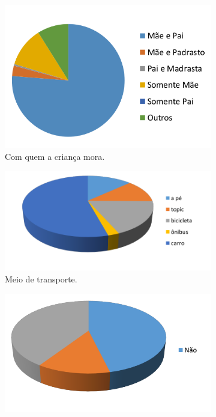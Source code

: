 \begin{figure}[!htbp]
    \centering
    \begin{subfigure}{.3\linewidth}
        \includegraphics[width=.9\linewidth,fbox]{figs/cdi/mora_com.png}
        \caption{Com quem a criança mora.}
        \label{fig:mora_com}
    \end{subfigure}%
    \begin{subfigure}{.3\textwidth}
        \includegraphics[width=.9\linewidth,fbox]{figs/cdi/meio_transporte.png}
        \caption{Meio de transporte.}
        \label{fig:transporte}
    \end{subfigure}%
   \begin{subfigure}{.3\textwidth}
        \includegraphics[width=.9\linewidth,fbox]{figs/cdi/tem_computador.png}

\end{subfigure}
\end{figure}
